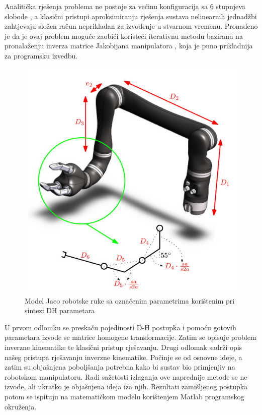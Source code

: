 \documentclass[times, utf8, diplomski, numeric]{fer}
\begin{document}
Analitička rješenja problema ne postoje za većinu konfiguracija sa 6 stupnjeva slobode \cite{grochow2004style}, a klasični pristupi aproksimiranju rješenja sustava nelinearnih jednadžbi \cite{broyden1965class}\cite{bi2009three} zahtjevaju složen račun neprikladan za izvođenje u stvarnom vremenu.
Pronađeno je da je ovaj problem moguće zaobići koristeći iterativnu metodu baziranu na pronalaženju inverza matrice Jakobijana manipulatora \cite{buss2004introduction}, koja je puno prikladnija za programsku izvedbu.
\begin{figure}[h!]
\centering
\includegraphics[scale=0.35]{jacoDH1}
\caption{Model Jaco robotske ruke sa označenim parametrima korištenim pri sintezi DH parametara} \label{jacoparam}
\end{figure}

U prvom odlomku se preskaču pojedinosti D-H postupka i pomoću gotovih parametara izvode se matrice homogene transformacije.
Zatim se opisuje problem inverzne kinematike te klasični pristup rješavanju.
Drugi odlomak sadrži opis našeg pristupa rješavanju inverzne kinematike.
Počinje se od osnovne ideje, a zatim su objašnjena poboljšanja potrebna kako bi sustav bio primjenjiv na robotskom manipulatoru.
Radi sažetosti izlaganja ove naprednije metode se ne izvode, ali ukratko je objašnjena ideja iza njih.
Rezultati zamišljenog postupka potom se ispituju na matematičkom modelu korištenjem Matlab programskog okruženja.
\end{document}
